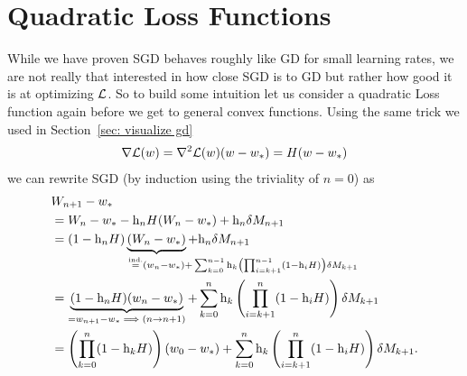 	


\section{Quadratic Loss Functions}

While we have proven SGD behaves roughly like GD for small learning rates, we
are not really that interested in how close SGD is to GD but rather how good it
is at optimizing \(\mathcal{L}\). So to build some intuition let us consider a
quadratic Loss function again before we get to general convex functions.
Using the same trick we used in Section~\ref{sec: visualize gd} 
\begin{align*}
	\nabla\mathcal{L}(w)
	= \nabla^2\mathcal{L}(w)(w-w_*)
	= H(w-w_*)
\end{align*}
we can rewrite SGD (by induction using the triviality of \(n=0\)) as
\begin{align}
	\nonumber
	&\Weights_{n+1}-\minimum\\
	\nonumber
	&= \Weights_n - \minimum - \lr_n H(\Weights_n-\minimum) + \lr_n\martIncr_{n+1}\\
	\label{eq: recursive SGD formula in the quadratic case}
	&=(1-\lr_n H)\underbrace{(\Weights_n - \minimum)}_{
		\xeq{\text{ind.}} (\weights_n - \minimum)
		\mathrlap{+ \sum_{k=0}^{n-1}\lr_k\left(\prod_{i=k+1}^{n-1}(1-\lr_iH)\right)\martIncr_{k+1}}
	} + \lr_n\martIncr_{n+1}\\
	\nonumber
	&= \underbrace{(1-\lr_n H)(\weights_n - \minimum)}_{=\weights_{n+1}-\minimum \implies (n\to n+1)}
	+ \sum_{k=0}^n\lr_k\left(\prod_{i=k+1}^n(1-\lr_iH)\right)\martIncr_{k+1}\\
	\label{eq: unrolled SGD weights (general quadratic loss case)}
	&=\left(\prod_{k=0}^n(1-\lr_kH)\right)(\weights_0-\minimum)
	+ \sum_{k=0}^n\lr_k\left(\prod_{i=k+1}^n(1-\lr_iH)\right)\martIncr_{k+1}.
\end{align}

